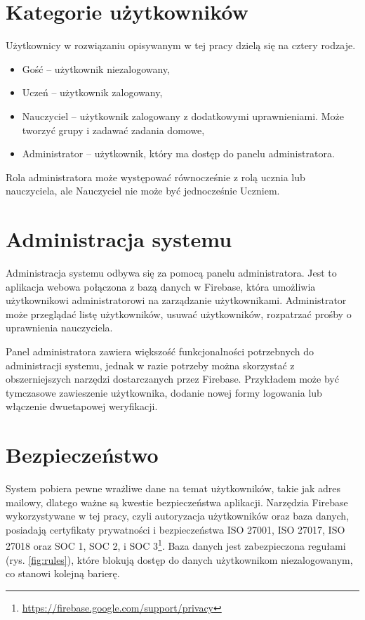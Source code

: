 \documentclass[a4paper,twoside,12pt]{book}
\begin{document}

\section{Kategorie użytkowników}

Użytkownicy w rozwiązaniu opisywanym w tej pracy dzielą się na cztery rodzaje. 
\begin{itemize}
\item Gość -- użytkownik niezalogowany,
\item Uczeń -- użytkownik zalogowany,
\item Nauczyciel -- użytkownik zalogowany z dodatkowymi uprawnieniami. Może tworzyć grupy i zadawać zadania domowe,
\item Administrator -- użytkownik, który ma dostęp do panelu administratora.
\end{itemize}
Rola administratora może występować równocześnie z rolą ucznia lub nauczyciela, ale Nauczyciel nie może być jednocześnie Uczniem.


\section{Administracja systemu}

Administracja systemu odbywa się za pomocą panelu administratora. Jest to aplikacja webowa połączona z bazą danych w Firebase, która umożliwia użytkownikowi  administratorowi na zarządzanie użytkownikami. Administrator może przeglądać listę użytkowników, usuwać użytkowników, rozpatrzać prośby o uprawnienia nauczyciela. 

Panel administratora zawiera większość funkcjonalności potrzebnych do administracji systemu, jednak w razie potrzeby można skorzystać z obszerniejszych narzędzi dostarczanych przez Firebase. Przykładem może być tymczasowe zawieszenie użytkownika, dodanie nowej formy logowania lub włączenie dwuetapowej weryfikacji.

\section{Bezpieczeństwo}

System pobiera pewne wrażliwe dane na temat użytkowników, takie jak adres mailowy, dlatego ważne są kwestie bezpieczeństwa aplikacji. Narzędzia Firebase wykorzystywane w tej pracy, czyli autoryzacja użytkowników oraz baza danych, posiadają certyfikaty prywatności i bezpieczeństwa ISO 27001, ISO 27017, ISO 27018 oraz SOC 1, SOC 2, i SOC 3\footnote{\url{https://firebase.google.com/support/privacy}}. 
Baza danych jest zabezpieczona regułami (rys. \ref{fig:rules}), które blokują dostęp do danych użytkownikom niezalogowanym, co stanowi kolejną barierę.
\end{document}
